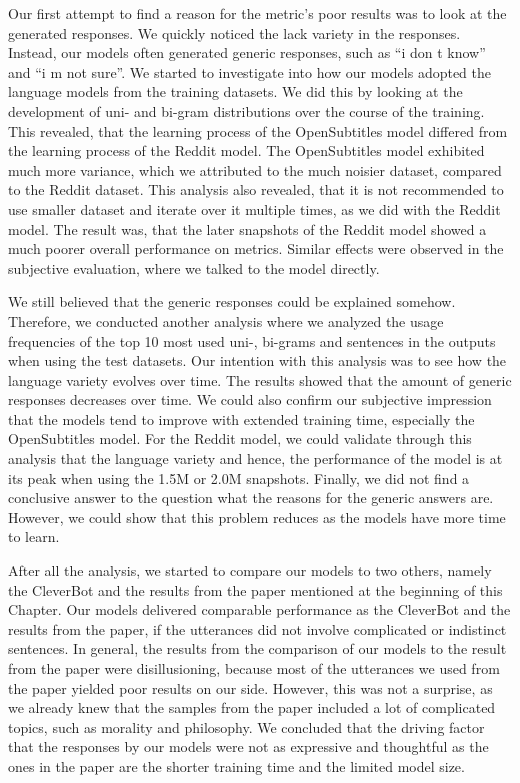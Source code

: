 Our first attempt to find a reason for the metric's poor results was to look at the generated responses. We quickly noticed the lack variety in the responses. Instead, our models often generated generic responses, such as ``i don t know'' and ``i m not sure''. We started to investigate into how our models adopted the language models from the training datasets. We did this by looking at the development of uni- and bi-gram distributions over the course of the training. This revealed, that the learning process of the OpenSubtitles model differed from the learning process of the Reddit model. The OpenSubtitles model exhibited much more variance, which we attributed to the much noisier dataset, compared to the Reddit dataset. This analysis also revealed, that it is not recommended to use smaller dataset and iterate over it multiple times, as we did with the Reddit model. The result was, that the later snapshots of the Reddit model showed a much poorer overall performance on metrics. Similar effects were observed in the subjective evaluation, where we talked to the model directly.

We still believed that the generic responses could be explained somehow. Therefore, we conducted another analysis where we analyzed the usage frequencies of the top 10 most used uni-, bi-grams and sentences in the outputs when using the test datasets. Our intention with this analysis was to see how the language variety evolves over time. The results showed that the amount of generic responses decreases over time. We could also confirm our subjective impression that the models tend to improve with extended training time, especially the OpenSubtitles model. For the Reddit model, we could validate through this analysis that the language variety and hence, the performance of the model is at its peak when using the 1.5M or 2.0M snapshots. Finally, we did not find a conclusive answer to the question what the reasons for the generic answers are. However, we could show that this problem reduces as the models have more time to learn.

After all the analysis, we started to compare our models to two others, namely the CleverBot and the results from the paper mentioned at the beginning of this Chapter. Our models delivered comparable performance as the CleverBot and the results from the paper, if the utterances did not involve complicated or indistinct sentences. In general, the results from the comparison of our models to the result from the paper were disillusioning, because most of the utterances we used from the paper yielded poor results on our side. However, this was not a surprise, as we already knew that the samples from the paper included a lot of complicated topics, such as morality and philosophy. We concluded that the driving factor that the responses by our models were not as expressive and thoughtful as the ones in the paper are the shorter training time and the limited model size.

